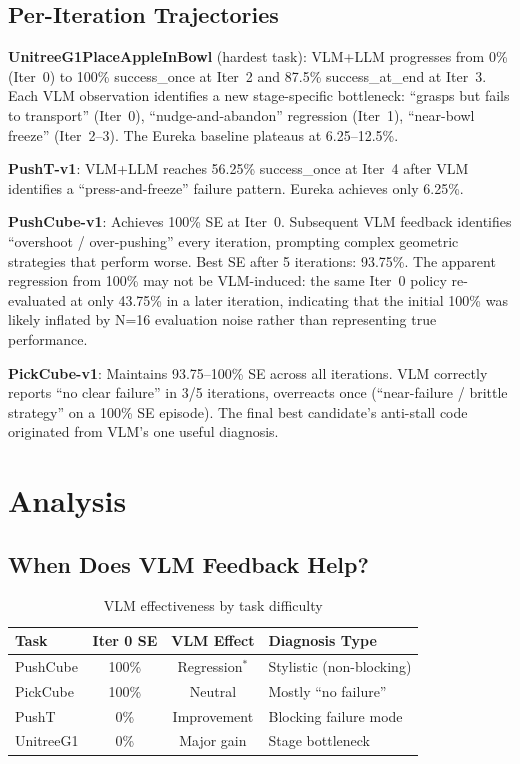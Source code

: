 \documentclass[conference]{IEEEtran}
\begin{document}
\subsection{Per-Iteration Trajectories}


\textbf{UnitreeG1PlaceAppleInBowl} (hardest task): VLM+LLM progresses from 0\%
(Iter~0) to 100\% success\_once at Iter~2 and 87.5\% success\_at\_end at
Iter~3. Each VLM observation identifies a new stage-specific bottleneck:
``grasps but fails to transport'' (Iter~0), ``nudge-and-abandon'' regression
(Iter~1), ``near-bowl freeze'' (Iter~2--3). The Eureka baseline plateaus at
6.25--12.5\%.

\textbf{PushT-v1}: VLM+LLM reaches 56.25\% success\_once at Iter~4 after VLM
identifies a ``press-and-freeze'' failure pattern. Eureka achieves only 6.25\%.

\textbf{PushCube-v1}: Achieves 100\% SE at Iter~0. Subsequent VLM feedback
identifies ``overshoot / over-pushing'' every iteration, prompting complex
geometric strategies that perform worse. Best SE after 5 iterations: 93.75\%.
The apparent regression from 100\% may not be VLM-induced: the same Iter~0
policy re-evaluated at only 43.75\% in a later iteration, indicating that the
initial 100\% was likely inflated by N=16 evaluation noise rather than
representing true performance.

\textbf{PickCube-v1}: Maintains 93.75--100\% SE across all iterations. VLM
correctly reports ``no clear failure'' in 3/5 iterations, overreacts once
(``near-failure / brittle strategy'' on a 100\% SE episode). The final best
candidate's anti-stall code originated from VLM's one useful diagnosis.


\section{Analysis}\label{sec:analysis}

\subsection{When Does VLM Feedback Help?}

\begin{table}[htbp]
\caption{VLM effectiveness by task difficulty}
\label{tab:vlm_effectiveness}
\centering
\begin{tabular}{lccl}
\toprule
Task & Iter 0 SE & VLM Effect & Diagnosis Type \\
\midrule
PushCube & 100\% & Regression$^*$ & Stylistic (non-blocking) \\
PickCube & 100\% & Neutral & Mostly ``no failure'' \\
PushT & 0\% & Improvement & Blocking failure mode \\
UnitreeG1 & 0\% & Major gain & Stage bottleneck \\
\bottomrule
\end{tabular}
\end{table}
\end{document}
